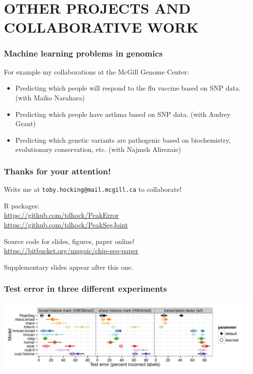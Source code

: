 \documentclass{beamer}
\begin{document}
\section{OTHER PROJECTS AND COLLABORATIVE WORK}

\begin{frame}
  \frametitle{Machine learning problems in genomics}
  For example my collaborations at the McGill Genome Center:
  \begin{itemize}
  \item Predicting which people will respond to the flu vaccine based
    on SNP data. (with Maiko Narahara)
  \item Predicting which people have asthma based on SNP
    data. (with Audrey Grant)
  \item Predicting which genetic variants are pathogenic based on
    biochemistry, evolutionary conservation, etc. (with
    Najmeh Alirezaie)
  \end{itemize}
\end{frame}


\begin{frame}
  \frametitle{Thanks for your attention!}
  Write me at \alert{\texttt{toby.hocking@mail.mcgill.ca}} to collaborate!

  \vskip 1cm

  R packages:\\
  \url{https://github.com/tdhock/PeakError}\\
  \url{https://github.com/tdhock/PeakSegJoint}

  \vskip 1cm

  Source code for slides, figures, paper online!\\
  \small
  \url{https://bitbucket.org/mugqic/chip-seq-paper}
  \vskip 1cm

  Supplementary slides appear after this one.

\end{frame}

\begin{frame}
  \frametitle{Test error in three different experiments}
  \includegraphics[width=1.1\textwidth]{figure-test-error-dots-mean.pdf}
\end{frame}
\end{document}
